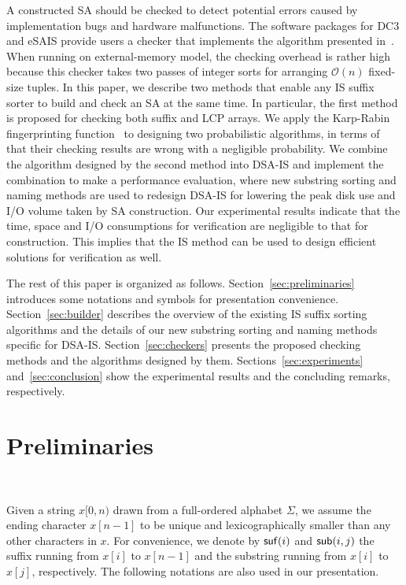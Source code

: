 \documentclass[10pt,journal,compsoc]{IEEEtran}
\begin{document}
A constructed SA should be checked to detect potential errors caused by implementation bugs and hardware malfunctions. The software packages for DC3 and eSAIS provide users a checker that implements the algorithm presented in~\cite{Dementiev2008a}. When running on external-memory model, the checking overhead is rather high because this checker takes two passes of integer sorts for arranging $\mathcal{O}(n)$ fixed-size tuples. In this paper, we describe two methods that enable any IS suffix sorter to build and check an SA at the same time. In particular, the first method is proposed for checking both suffix and LCP arrays. We apply the Karp-Rabin fingerprinting function~\cite{Karp1987} to designing two probabilistic algorithms, in terms of that their checking results are wrong with a negligible probability. We combine the algorithm designed by the second method into DSA-IS and implement the combination to make a performance evaluation, where new substring sorting and naming methods are used to redesign DSA-IS for lowering the peak disk use and I/O volume taken by SA construction. Our experimental results indicate that the time, space and I/O consumptions for verification are negligible to that for construction. This implies that the IS method can be used to design efficient solutions for verification as well.

The rest of this paper is organized as follows. Section~\ref{sec:preliminaries} introduces some notations and symbols for presentation convenience. Section~\ref{sec:builder} describes the overview of the existing IS suffix sorting algorithms and the details of our new substring sorting and naming methods specific for DSA-IS. Section~\ref{sec:checkers} presents the proposed checking methods and the algorithms designed by them. Sections~\ref{sec:experiments} and~\ref{sec:conclusion} show the experimental results and the concluding remarks, respectively.

\section{Preliminaries}~\label{sec:preliminaries}

Given a string $x[0,n)$ drawn from a full-ordered alphabet $\Sigma$, we assume the ending character $x[n - 1]$ to be unique and lexicographically smaller than any other characters in $x$. For convenience, we denote by ${\sf suf}(i)$ and ${\sf sub}(i, j)$ the suffix running from $x[i]$ to $x[n-  1]$ and the substring running from $x[i]$ to $x[j]$, respectively. The following notations are also used in our presentation.
\end{document}
